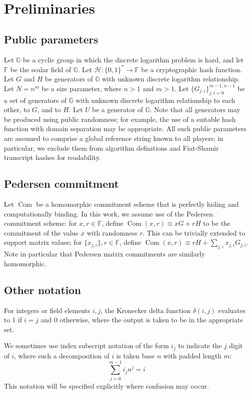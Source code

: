 \documentclass{article}
\newcommand{\G}{\mathbb{G}}
\newcommand{\F}{\mathbb{F}}
\newcommand{\com}{\operatorname{Com}}
\newcommand{\hs}{\mathcal{H}}
\theoremstyle{definition}
\begin{document}
\section{Preliminaries}
\subsection{Public parameters}
Let $\G$ be a cyclic group in which the discrete logarithm problem is hard, and let $\F$ be the scalar field of $\G$.
Let $\hs: \{0,1\}^* \to \F$ be a cryptographic hash function.
Let $G$ and $H$ be generators of $\G$ with unknown discrete logarithm relationship.
Let $N = n^m$ be a size parameter, where $n > 1$ and $m > 1$.
Let $\{G_{j,i}\}_{j,i=0}^{m-1,n-1}$ be a set of generators of $\G$ with unknown discrete logarithm relationship to each other, to $G$, and to $H$.
Let $U$ be a generator of $\G$.
Note that all generators may be produced using public randomness; for example, the use of a suitable hash function with domain separation may be appropriate.
All such public parameters are assumed to comprise a global reference string known to all players; in particular, we exclude them from algorithm definitions and Fiat-Shamir transcript hashes for readability.


\subsection{Pedersen commitment}
Let $\com$ be a homomorphic commitment scheme that is perfectly hiding and computationally binding.
In this work, we assume use of the Pedersen commitment scheme: for $x,r \in \F$, define $\com(x,r) \equiv xG + rH$ to be the commitment of the value $x$ with randomness $r$.
This can be trivially extended to support matrix values; for $\{x_{j,i}\},r \in \F$, define $\com(x,r) \equiv rH + \sum_{j,i} x_{j,i}G_{j,i}$.
Note in particular that Pedersen matrix commitments are similarly homomorphic.


\subsection{Other notation}
For integers or field elements $i,j$, the Kronecker delta function $\delta(i,j)$ evaluates to $1$ if $i=j$ and $0$ otherwise, where the output is taken to be in the appropriate set.

We sometimes use index subscript notation of the form $i_j$ to indicate the $j$ digit of $i$, where such a decomposition of $i$ is taken base $n$ with padded length $m$:
$$\sum_{j=0}^{m-1} i_j n^j = i$$
This notation will be specified explicitly where confusion may occur.
\end{document}
